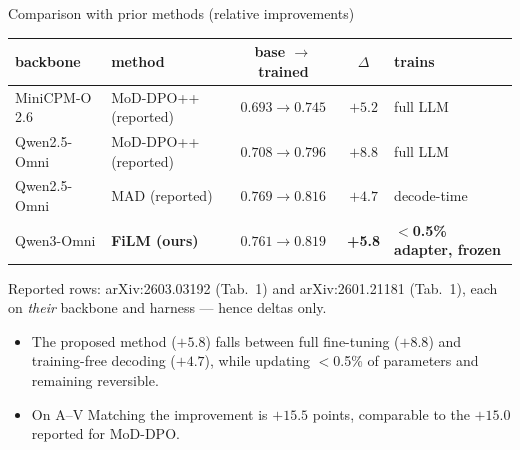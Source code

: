 \documentclass[aspectratio=169,11pt]{beamer}
\begin{document}
\begin{frame}{Comparison with prior methods (relative improvements)}
\centering
\renewcommand{\arraystretch}{1.25}
\footnotesize
\begin{tabular}{l l c c l}
\toprule
backbone & method & base $\to$ trained & $\Delta$ & trains \\
\midrule
MiniCPM-O 2.6 & MoD-DPO++ {\scriptsize(reported)} & $0.693 \to 0.745$ & $+5.2$ & \textcolor{red!70!black}{full LLM} \\
Qwen2.5-Omni  & MoD-DPO++ {\scriptsize(reported)} & $0.708 \to 0.796$ & $+8.8$ & \textcolor{red!70!black}{full LLM} \\
Qwen2.5-Omni  & MAD {\scriptsize(reported)}       & $0.769 \to 0.816$ & $+4.7$ & \textcolor{frz}{decode-time} \\
\midrule
Qwen3-Omni    & \textbf{FiLM (ours)} & $0.761 \to 0.819$ & \textbf{+5.8} & \textcolor{trn}{\textbf{$<$0.5\% adapter, frozen}} \\
\bottomrule
\end{tabular}
\par\vspace{0.3em}
{\scriptsize Reported rows: arXiv:2603.03192 (Tab.~1) and arXiv:2601.21181 (Tab.~1), each on
\emph{their} backbone and harness --- hence deltas only.}
\vfill
\begin{itemize}\footnotesize
\item The proposed method ($+5.8$) falls between full fine-tuning ($+8.8$) and training-free
decoding ($+4.7$), while updating $<$0.5\% of parameters and remaining reversible.
\item On A--V Matching the improvement is $+15.5$ points, comparable to the $+15.0$ reported for
MoD-DPO.
\end{itemize}
\end{frame}

\end{document}
